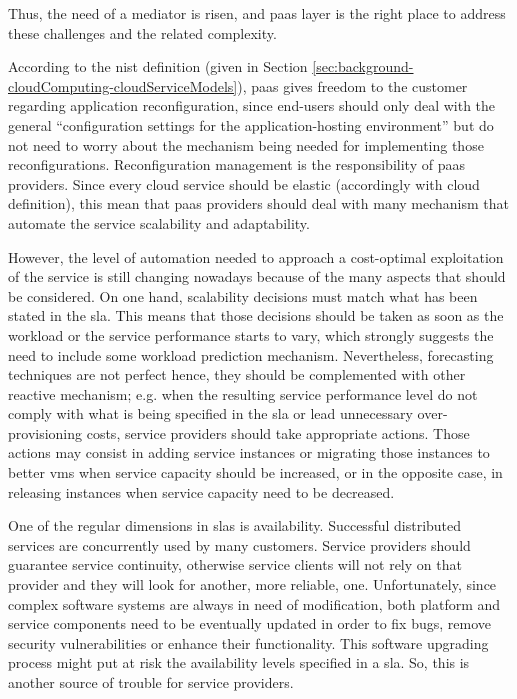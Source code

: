Thus, the need of a mediator is risen, and \ac{paas} layer is the right place to address these challenges
and the related complexity.

According to the \ac{nist} definition (given in Section
\ref{sec:background-cloudComputing-cloudServiceModels}), \ac{paas} gives freedom to the customer regarding
application reconfiguration, since end-users should only deal with the general ``configuration settings
for the application-hosting environment'' but do not need to worry about the mechanism being needed
for implementing those reconfigurations. Reconfiguration management is the responsibility of \ac{paas}
providers. Since every cloud service should be elastic (accordingly with cloud definition), this mean
that \ac{paas} providers should deal with many mechanism that automate the service scalability and
adaptability.

However, the level of automation needed to approach a cost-optimal exploitation of the service is still
changing nowadays because of the many aspects that should be considered. On one hand, scalability
decisions must match what has been stated in the \ac{sla}. This means that those decisions should be
taken as soon as the workload or the service performance starts to vary, which strongly suggests the
need to include some workload prediction mechanism. Nevertheless, forecasting techniques are not perfect
hence, they should be complemented with other reactive mechanism; e.g. when the resulting service
performance level do not comply with what is being specified in the \ac{sla} or lead unnecessary
over-provisioning costs, service providers should take appropriate actions. Those actions may consist
in adding service instances or migrating those instances to better \ac{vm}s when service capacity
should be increased, or in the opposite case, in releasing instances when service capacity need to be
decreased.

One of the regular dimensions in \ac{sla}s is availability. Successful distributed services are
concurrently used by many customers. Service providers should guarantee service continuity, otherwise
service clients will not rely on that provider and they will look for another, more reliable, one.
Unfortunately, since complex software systems are always in need of modification, both platform and
service components need to be eventually updated in order to fix bugs, remove security vulnerabilities
or enhance their functionality. This software upgrading process might put at risk the availability levels
specified in a \ac{sla}. So, this is another source of trouble for service providers.

